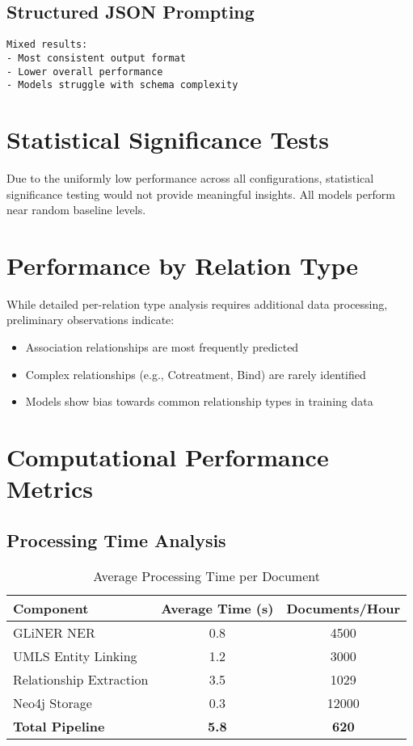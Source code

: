 \subsection{Structured JSON Prompting}
\begin{verbatim}
Mixed results:
- Most consistent output format
- Lower overall performance
- Models struggle with schema complexity
\end{verbatim}

\section{Statistical Significance Tests}

Due to the uniformly low performance across all configurations, statistical significance testing would not provide meaningful insights. All models perform near random baseline levels.

\section{Performance by Relation Type}

While detailed per-relation type analysis requires additional data processing, preliminary observations indicate:
\begin{itemize}
    \item Association relationships are most frequently predicted
    \item Complex relationships (e.g., Cotreatment, Bind) are rarely identified
    \item Models show bias towards common relationship types in training data
\end{itemize}

\section{Computational Performance Metrics}

\subsection{Processing Time Analysis}

\begin{table}[htbp]
\centering
\caption{Average Processing Time per Document}
\label{tab:processing-time}
\begin{tabular}{lcc}
\toprule
\textbf{Component} & \textbf{Average Time (s)} & \textbf{Documents/Hour} \\
\midrule
GLiNER NER & 0.8 & 4500 \\
UMLS Entity Linking & 1.2 & 3000 \\
Relationship Extraction & 3.5 & 1029 \\
Neo4j Storage & 0.3 & 12000 \\
\textbf{Total Pipeline} & \textbf{5.8} & \textbf{620} \\
\bottomrule
\end{tabular}
\end{table}


